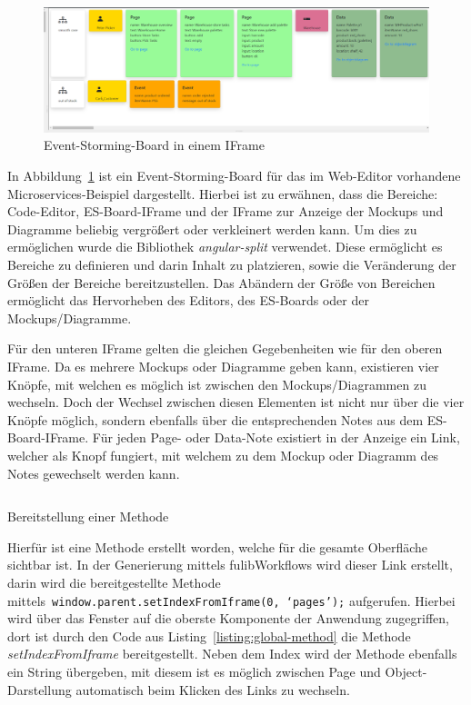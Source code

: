 
\begin{figure}[h]
    \centering
    \includegraphics[width=1.0\textwidth]{images/3.2/board}
    \caption{Event-Storming-Board in einem IFrame}
    \label{fig:esBoard}
\end{figure}

In Abbildung~\ref{fig:esBoard} ist ein Event-Storming-Board für das im Web-Editor vorhandene Microservices-Beispiel dargestellt.
Hierbei ist zu erwähnen, dass die Bereiche: Code-Editor, \ac{ES}-Board-IFrame und der IFrame zur Anzeige der Mockups und Diagramme beliebig vergrößert oder verkleinert werden kann.
Um dies zu ermöglichen wurde die Bibliothek \textit{angular-split} verwendet.
Diese ermöglicht es Bereiche zu definieren und darin Inhalt zu platzieren, sowie die Veränderung der Größen der Bereiche bereitzustellen\cite*{angular-split}.
Das Abändern der Größe von Bereichen ermöglicht das Hervorheben des Editors, des \ac{ES}-Boards oder der Mockups/Diagramme.

Für den unteren IFrame gelten die gleichen Gegebenheiten wie für den oberen IFrame.
Da es mehrere Mockups oder Diagramme geben kann, existieren vier Knöpfe, mit welchen es möglich ist zwischen den Mockups/Diagrammen zu wechseln.
Doch der Wechsel zwischen diesen Elementen ist nicht nur über die vier Knöpfe möglich, sondern ebenfalls über die entsprechenden Notes aus dem \ac{ES}-Board-IFrame.
Für jeden Page- oder Data-Note existiert in der Anzeige ein Link, welcher als Knopf fungiert, mit welchem zu dem Mockup oder Diagramm des Notes gewechselt werden kann.

\begin{listing}[!ht]
    \inputminted{ts}{listings/3.2/method.ts}
    \caption{Bereitstellung einer Methode}
    \label{listing:global-method}
\end{listing}

Hierfür ist eine Methode erstellt worden, welche für die gesamte Oberfläche sichtbar ist.
In der Generierung mittels fulibWorkflows wird dieser Link erstellt, darin wird die bereitgestellte Methode mittels~\texttt{window.parent.setIndexFromIframe(0, `pages');} aufgerufen.
Hierbei wird über das Fenster auf die oberste Komponente der Anwendung zugegriffen, dort ist durch den Code aus Listing~\ref{listing:global-method}
die Methode \textit{setIndexFromIframe} bereitgestellt.
Neben dem Index wird der Methode ebenfalls ein String übergeben, mit diesem ist es möglich zwischen Page und Object-Darstellung automatisch beim Klicken des Links zu wechseln.

